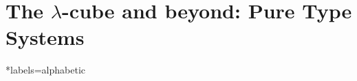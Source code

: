 \documentclass[reqno]{amsart}
\begin{document}
    \begin{theorem}

    \end{theorem}

    \section{The $\lambda$-cube and beyond: Pure Type Systems}

    \begin{definition}
        
    \end{definition}

    \begin{lemma}
        
    \end{lemma}

    \begin{theorem}
        
    \end{theorem}

    \begin{bibdiv}
        \begin{biblist}*{labels={alphabetic}}
        \end{biblist}
    \end{bibdiv}
\end{document}
